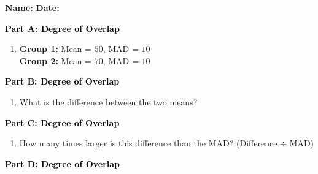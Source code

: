 \documentclass[12pt, letterpaper, fleqn]{article}
\newcommand{\blank}{\underline{\hspace{2.2cm}}}
\begin{document}
\textbf{Name:} \underline{\hspace{5cm}}
\hfill
\textbf{Date:} \underline{\hspace{3cm}}\\

\begin{tcolorbox}[colback=customteal!20]
\large\textcolor{black}{\textbf{Part A: Degree of Overlap}}
\end{tcolorbox}

\vspace{3mm}

\begin{enumerate}[itemsep=5.5cm, leftmargin=0.6cm]
\item \textbf{Group 1:} Mean = $50$, MAD = $10$ \\
\textbf{Group 2:} Mean = $70$, MAD = $10$ 
\end{enumerate}

\newpage

\begin{tcolorbox}[colback=customteal!20]
\large\textcolor{black}{\textbf{Part B: Degree of Overlap}}
\end{tcolorbox}

\vspace{3mm}

\begin{enumerate}[itemsep=5.5cm, leftmargin=0.6cm, resume]
\item What is the difference between the two means? \blank
\end{enumerate}

\newpage

\begin{tcolorbox}[colback=customteal!20]
\large\textcolor{black}{\textbf{Part C: Degree of Overlap}}
\end{tcolorbox}

\vspace{3mm}

\begin{enumerate}[itemsep=5.5cm, leftmargin=0.6cm, resume]
\item How many times larger is this difference than the MAD? (Difference $\div$ MAD) \blank
\end{enumerate}

\newpage

\begin{tcolorbox}[colback=customteal!20]
\large\textcolor{black}{\textbf{Part D: Degree of Overlap}}
\end{tcolorbox}
\end{document}
